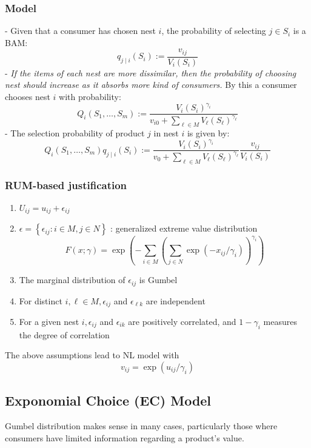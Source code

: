 \documentclass[11pt,a4paper]{article}
\begin{document}
\subsubsection{Model}
- Given that a consumer has chosen nest $i$, the probability of selecting $j \in S_{i}$ is a BAM:
$$
q_{j \mid i}\left(S_{i}\right):=\frac{v_{i j}}{V_{i}\left(S_{i}\right)}
$$
- \textit{If the items of each nest are more dissimilar, then the probability of choosing nest should increase as it absorbs more kind of consumers.} By this a consumer chooses nest $i$ with probability:
$$
Q_{i}\left(S_{1}, \ldots, S_{m}\right):=\frac{V_{i}\left(S_{i}\right)^{\gamma_{i}}}{v_{i 0}+\sum_{\ell \in M} V_{\ell}\left(S_{\ell}\right)^{\gamma_{\ell}}}
$$
- The selection probability of product $j$ in nest $i$ is given by:
$$
Q_{i}\left(S_{1}, \ldots, S_{m}\right) q_{j \mid i}\left(S_{i}\right):=\frac{V_{i}\left(S_{i}\right)^{\gamma_{i}}}{v_{0}+\sum_{\ell \in M} V_{\ell}\left(S_{\ell}\right)^{\gamma_{\ell}}} \frac{v_{i j}}{V_{i}\left(S_{i}\right)}
$$

\subsubsection{RUM-based justification}
\begin{enumerate}[$\bullet$]
    \item $U_{i j}=u_{i j}+\epsilon_{i j}$
    \item $\epsilon=\left\{\epsilon_{i j}: i \in M, j \in N\right\}$ : generalized extreme value distribution
    $$
    F(x ; \gamma)=\exp \left(-\sum_{i \in M}\left(\sum_{j \in N} \exp \left(-x_{i j} / \gamma_{i}\right)\right)^{\gamma_{i}}\right)
    $$
    \item The marginal distribution of $\epsilon_{i j}$ is Gumbel
    \item For distinct $i, \ell \in M, \epsilon_{i j}$ and $\epsilon_{\ell k}$ are independent
    \item For a given nest $i, \epsilon_{i j}$ and $\epsilon_{i k}$ are positively correlated, and $1-\gamma_{i}$ measures the degree of correlation
\end{enumerate}
The above assumptions lead to NL model with
$$
v_{i j}=\exp \left(u_{i j} / \gamma_{i}\right)
$$




\subsection{Exponomial Choice (EC) Model}
Gumbel distribution makes sense in many cases, particularly those where consumers have limited information regarding a product’s value.
\end{document}
